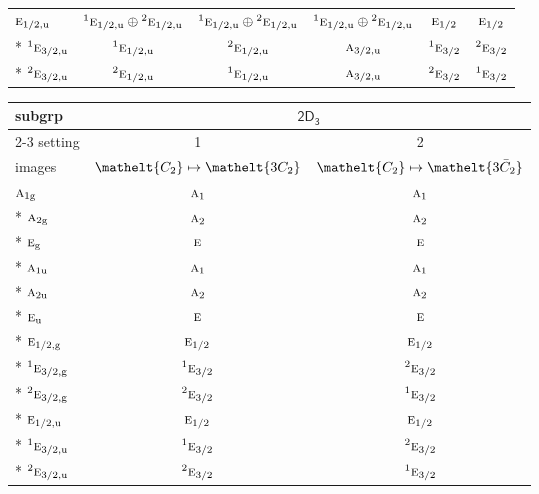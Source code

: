 \documentclass[10pt,a4paper]{article}
\numberwithin{equation}{section}
\newcommand{\eltfont}[1]{{\let\sigma\eltsigma\mathelt{#1}}}
\newcommand{\grp}[1]{\mathsf{#1}}
\newcommand{\irr}[1]{\text{\normalfont\scshape #1}}
\newcommand{\conjpair}[1]{{}^{#1}}
\newcommand{\cls}[1]{\eltfont{#1}}
\newcommand{\ptag}[1]{\mathrm{#1}}
\newcommand{\barred}[1]{\bar{#1}}
\begin{document}
{\begin{longtable}{@{}lccccc@{}}
$\irr{e}_{1/2,\ptag{u}}$ & $\conjpair{1}\irr{e}_{1/2,\ptag{u}}\oplus \conjpair{2}\irr{e}_{1/2,\ptag{u}}$ & $\conjpair{1}\irr{e}_{1/2,\ptag{u}}\oplus \conjpair{2}\irr{e}_{1/2,\ptag{u}}$ & $\conjpair{1}\irr{e}_{1/2,\ptag{u}}\oplus \conjpair{2}\irr{e}_{1/2,\ptag{u}}$ & $\irr{e}_{1/2}$ & $\irr{e}_{1/2}$\\*
$\conjpair{1}\irr{e}_{3/2,\ptag{u}}$ & $\conjpair{1}\irr{e}_{1/2,\ptag{u}}$ & $\conjpair{2}\irr{e}_{1/2,\ptag{u}}$ & $\irr{a}_{3/2,\ptag{u}}$ & $\conjpair{1}\irr{e}_{3/2}$ & $\conjpair{2}\irr{e}_{3/2}$\\*
$\conjpair{2}\irr{e}_{3/2,\ptag{u}}$ & $\conjpair{2}\irr{e}_{1/2,\ptag{u}}$ & $\conjpair{1}\irr{e}_{1/2,\ptag{u}}$ & $\irr{a}_{3/2,\ptag{u}}$ & $\conjpair{2}\irr{e}_{3/2}$ & $\conjpair{1}\irr{e}_{3/2}$\\
\bottomrule\end{longtable}}
{\small\begin{longtable}{@{}lcc@{}}\toprule
subgrp & \multicolumn{2}{c}{\href{2D3.pdf}{$\grp{2D_{3}}$}}\\\cmidrule(lr){2-3}
setting & 1 & 2\\
images & {\scriptsize $\cls{C_{2}} \mapsto \cls{3C_{2}}$} & {\scriptsize $\cls{C_{2}} \mapsto \cls{3\barred{C}_{2}}$}\\\midrule\endhead
\bottomrule\endfoot\endlastfoot
$\irr{a}_{1\ptag{g}}$ & $\irr{a}_{1}$ & $\irr{a}_{1}$\\*
$\irr{a}_{2\ptag{g}}$ & $\irr{a}_{2}$ & $\irr{a}_{2}$\\*
$\irr{e}_{\ptag{g}}$ & $\irr{e}$ & $\irr{e}$\\*
$\irr{a}_{1\ptag{u}}$ & $\irr{a}_{1}$ & $\irr{a}_{1}$\\*
$\irr{a}_{2\ptag{u}}$ & $\irr{a}_{2}$ & $\irr{a}_{2}$\\*
$\irr{e}_{\ptag{u}}$ & $\irr{e}$ & $\irr{e}$\\*
$\irr{e}_{1/2,\ptag{g}}$ & $\irr{e}_{1/2}$ & $\irr{e}_{1/2}$\\*
$\conjpair{1}\irr{e}_{3/2,\ptag{g}}$ & $\conjpair{1}\irr{e}_{3/2}$ & $\conjpair{2}\irr{e}_{3/2}$\\*
$\conjpair{2}\irr{e}_{3/2,\ptag{g}}$ & $\conjpair{2}\irr{e}_{3/2}$ & $\conjpair{1}\irr{e}_{3/2}$\\*
$\irr{e}_{1/2,\ptag{u}}$ & $\irr{e}_{1/2}$ & $\irr{e}_{1/2}$\\*
$\conjpair{1}\irr{e}_{3/2,\ptag{u}}$ & $\conjpair{1}\irr{e}_{3/2}$ & $\conjpair{2}\irr{e}_{3/2}$\\*
$\conjpair{2}\irr{e}_{3/2,\ptag{u}}$ & $\conjpair{2}\irr{e}_{3/2}$ & $\conjpair{1}\irr{e}_{3/2}$\\
\bottomrule\end{longtable}}
\end{document}
